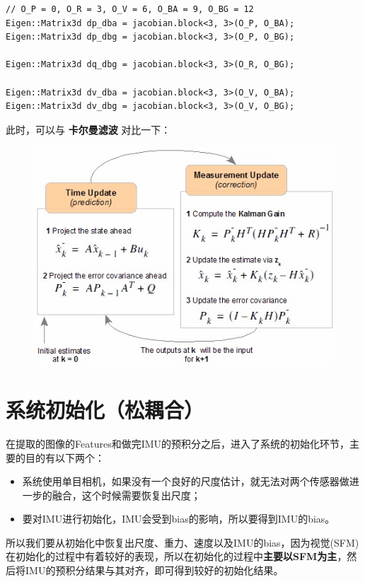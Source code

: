 \documentclass[12pt,a4paper]{article}
\begin{document}
\begin{lstlisting}
// O_P = 0, O_R = 3, O_V = 6, O_BA = 9, O_BG = 12
Eigen::Matrix3d dp_dba = jacobian.block<3, 3>(O_P, O_BA);
Eigen::Matrix3d dp_dbg = jacobian.block<3, 3>(O_P, O_BG);

Eigen::Matrix3d dq_dbg = jacobian.block<3, 3>(O_R, O_BG);

Eigen::Matrix3d dv_dba = jacobian.block<3, 3>(O_V, O_BA);
Eigen::Matrix3d dv_dbg = jacobian.block<3, 3>(O_V, O_BG);
\end{lstlisting}

此时，可以与 \textbf{卡尔曼滤波} 对比一下：

\begin{figure}[htbp]
\centering
\includegraphics[scale=0.6]{images/kf_flow.jpg}
\end{figure}


\section{系统初始化（松耦合）}

在提取的图像的Features和做完IMU的预积分之后，进入了系统的初始化环节，主要的目的有以下两个：      

\begin{itemize}
\item 系统使用单目相机，如果没有一个良好的尺度估计，就无法对两个传感器做进一步的融合，这个时候需要恢复出尺度；
\item 要对IMU进行初始化，IMU会受到bias的影响，所以要得到IMU的bias。
\end{itemize}

所以我们要从初始化中恢复出尺度、重力、速度以及IMU的bias，因为视觉(SFM)在初始化的过程中有着较好的表现，所以在初始化的过程中\textbf{主要以SFM为主}，然后将IMU的预积分结果与其对齐，即可得到较好的初始化结果。
\end{document}
